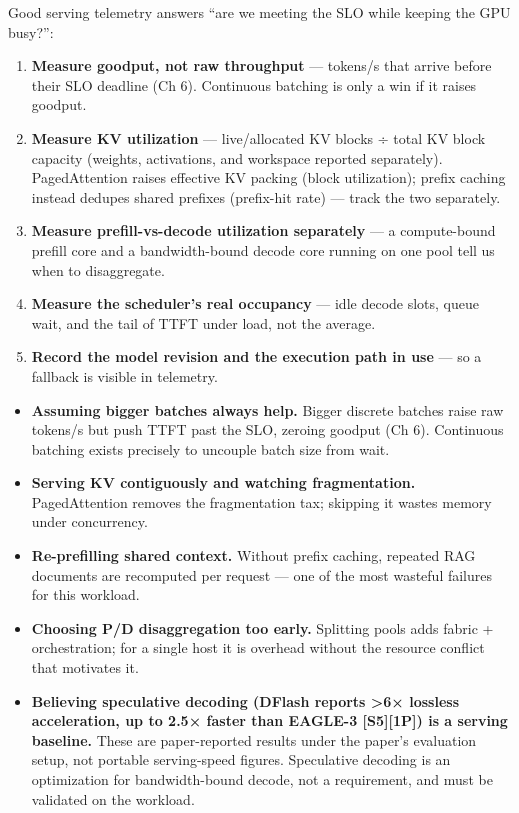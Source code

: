 \label{measurement}


Good serving telemetry answers ``are we meeting the SLO while keeping
the GPU busy?'':

\begin{enumerate}
\def\labelenumi{\arabic{enumi}.}
\item
  \textbf{Measure goodput, not raw throughput} --- tokens/s that arrive
  before their SLO deadline (Ch 6). Continuous batching is only a win if
  it raises goodput.
\item
  \textbf{Measure KV utilization} --- live/allocated KV blocks ÷ total
  KV block capacity (weights, activations, and workspace reported
  separately). PagedAttention raises effective KV packing (block
  utilization); prefix caching instead dedupes shared prefixes
  (prefix-hit rate) --- track the two separately.
\item
  \textbf{Measure prefill-vs-decode utilization separately} --- a
  compute-bound prefill core and a bandwidth-bound decode core running
  on one pool tell us when to disaggregate.
\item
  \textbf{Measure the scheduler's real occupancy} --- idle decode slots,
  queue wait, and the tail of TTFT under load, not the average.
\item
  \textbf{Record the model revision and the execution path in use} ---
  so a fallback is visible in telemetry.
\end{enumerate}

\label{common-mistakes}


\begin{itemize}
\item
  \textbf{Assuming bigger batches always help.} Bigger discrete batches
  raise raw tokens/s but push TTFT past the SLO, zeroing goodput (Ch 6).
  Continuous batching exists precisely to uncouple batch size from wait.
\item
  \textbf{Serving KV contiguously and watching fragmentation.}
  PagedAttention removes the fragmentation tax; skipping it wastes
  memory under concurrency.
\item
  \textbf{Re-prefilling shared context.} Without prefix caching,
  repeated RAG documents are recomputed per request --- one of the most
  wasteful failures for this workload.
\item
  \textbf{Choosing P/D disaggregation too early.} Splitting pools adds
  fabric + orchestration; for a single host it is overhead without the
  resource conflict that motivates it.
\item
  \textbf{Believing speculative decoding (DFlash reports \textgreater6×
  lossless acceleration, up to 2.5× faster than EAGLE-3
  \mbox{{[}S5{]}}\hspace{0pt}\mbox{{[}1P{]}}) is a serving baseline.} These are paper-reported
  results under the paper's evaluation setup, not portable serving-speed
  figures. Speculative decoding is an optimization for bandwidth-bound
  decode, not a requirement, and must be validated on the workload.
\end{itemize}

